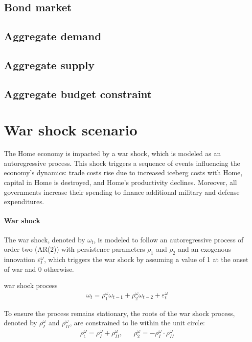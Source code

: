 \subsection{Bond market}


\subsection{Aggregate demand}


\subsection{Aggregate supply}


\subsection{Aggregate budget constraint}


\newpage
\section{War shock scenario}
The Home economy is impacted by a war shock, which is modeled as an autoregressive process.
This shock triggers a sequence of events influencing the economy's dynamics:
  trade costs rise due to increased iceberg costs with Home,
  capital in Home is destroyed,
  and Home's productivity declines.
Moreover, all governments increase their spending to finance additional military and defense expenditures.

\paragraph{War shock\label{sec:WarShock}}
The war shock, denoted by \(\omega_{t}\), is modeled to follow an autoregressive process of order two
  (AR{(2)}) with persistence parameters \(\rho_{1}\) and \(\rho_{2}\) and an exogenous innovation \(\varepsilon^{\omega}_{t}\),
  which triggers the war shock by assuming a value of 1 at the onset of war and 0 otherwise.
\begin{tcolorbox}[colback=lightGray, boxrule=1pt, center title, title=\textbf{War Shock}]
war shock process
\begin{align*}
\omega_{t} = \rho^{\omega}_{1} \omega_{t-1} + \rho^{\omega}_{2} \omega_{t-2} + \varepsilon^{\omega}_{t}
\end{align*}
\end{tcolorbox}
To ensure the process remains stationary, the roots of the war shock process,
  denoted by \(\rho^{\omega}_{I}\) and \(\rho^{\omega}_{II}\),
  are constrained to lie within the unit circle:
\begin{align*}
\rho^{\omega}_{1} = \rho^{\omega}_{I} + \rho^{\omega}_{II}, && \rho^{\omega}_{2} = - \rho^{\omega}_{I} \cdot \rho^{\omega}_{II}
\end{align*}

